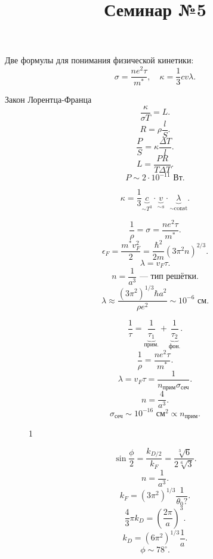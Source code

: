 \documentclass[a4paper]{article}
\title{Семинар №5}
\begin{document}
	\maketitle
Две формулы для понимания физической кинетики:
\[
\sigma=\frac{ne^2 \tau}{m^*},\quad \kappa=\frac{1}{3} c v \lambda
.\] 
\begin{hiProb}[0-5-1]
\end{hiProb}
\begin{sol}
Закон Лорентца-Франца
\[
\frac{\kappa}{\sigma T}=L
.\] 
\[
R=\rho \frac{l}{S}
.\] 
\[
\frac{P}{S}=\kappa \frac{\Delta T}{l}
.\] 
\[
L=\frac{PR}{T\Delta T}
.\] 
\[
P \sim 2 \cdot 10^{-11} \text{ Вт}
.\] 
\end{sol}
\begin{hiProb}[0-5-2]
\end{hiProb}
\begin{sol}
\[
\kappa= \frac{1}{3} \underbrace{c}_{\sim T^3}\cdot \underbrace{v}_{\sim s} \cdot
\underbrace{\lambda}_{\sim \text{const}}
.\] 
\end{sol}
\begin{hiProb}[3.65]
\end{hiProb}
\begin{sol}
\[
\frac{1}{\rho}= \sigma= \frac{n e^2 \tau}{m^*}
.\] 
\[
	\epsilon_F= \frac{m^* v_F^2}{2}= \frac{\hbar^2}{2m} (3\pi^2
	n)^{2 /3}
.\] 
\[
\lambda= v_F \tau
.\] 
\[
n=\frac{1}{a^3} \text{ --- тип решётки}
.\] 
\[
	\lambda\approx  \frac{(3\pi^2)^{1 /3} \hbar a^2}{\rho e^2}\sim 10^{-6} \text{ см}
.\] 
\end{sol}
\begin{hiProb}[3.75]
\end{hiProb}
\begin{sol}
\[
\frac{1}{\tau}= \underbrace{\frac{1}{\tau_1}}_{\text{прим.}}+
\underbrace{\frac{1}{\tau_2}}_{\text{фон.}}
.\] 
\[
\frac{1}{\rho}= \frac{ne^2 \tau}{m^*}
.\] 
\[
\lambda = v_F \tau= \frac{1}{n_{\text{прим}}\sigma_\text{сеч}}
.\] 
\[
n=\frac{4}{a^3}
.\] 
\[
\sigma_\text{сеч} \sim 10^{-16} \text{ см}^2 \propto n_\text{прим}
.\] 
\end{sol}
\begin{hiProb}[3.9]
\end{hiProb}
\begin{sol}
\begin{figure}[ht]
    \centering
    \caption{1}
    \label{fig:1}
\end{figure}
\[
\sin \frac{\phi}{2}= \frac{k_{D /2}}{k_F}=
\frac{\sqrt[3]{6} }{2 \sqrt[6]{3} }
.\] 
\[
n=\frac{1}{a^3}
.\] 
\[
	k_F=(3\pi^2)^{1 /3} \frac{1}{\theta_0?}
.\] 
\[
	\frac{4}{3} \pi k_D = \left( \frac{2\pi}{a} \right) ^3
.\] 
\[
	k_D= (6\pi^2)^{1 /3} \frac{1}{a}
.\] 
\[
\phi \sim  78 ^\circ
.\] 
\end{sol}
\end{document}
